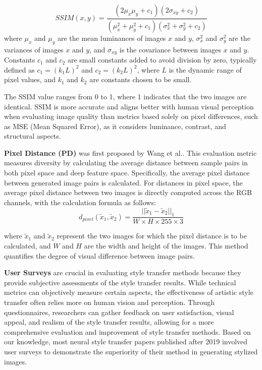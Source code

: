\documentclass[preprint,12pt]{elsarticle}
\begin{document}
\begin{equation}
    SSIM(x, y) = \frac{(2\mu_x\mu_y + c_1)(2\sigma_{xy} + c_2)}{(\mu_x^2 + \mu_y^2 + c_1)(\sigma_x^2 + \sigma_y^2 + c_2)}
\end{equation}
where $\mu_x$ and $\mu_y$ are the mean luminances of images $x$ and $y$, $\sigma_x^2$ and $\sigma_y^2$ are the variances of images $x$ and $y$, and $\sigma_{xy}$ is the covariance between images $x$ and $y$. Constants $c_1$ and $c_2$ are small constants added to avoid division by zero, typically defined as $c_1=(k_1 L)^2$ and $c_2=(k_2 L)^2$, where $L$ is the dynamic range of pixel values, and $k_1$ and $k_2$ are constants chosen to be small.

The SSIM value ranges from 0 to 1, where 1 indicates that the two images are identical. SSIM is more accurate and aligns better with human visual perception when evaluating image quality than metrics based solely on pixel differences, such as MSE (Mean Squared Error), as it considers luminance, contrast, and structural aspects.

\textbf{Pixel Distance (PD)} was first proposed by Wang et al.\citep{76wang2020diversified}. This evaluation metric measures diversity by calculating the average distance between sample pairs in both pixel space and deep feature space. Specifically, the average pixel distance between generated image pairs is calculated. For distances in pixel space, the average pixel distance between two images is directly computed across the RGB channels, with the calculation formula as follows:
\begin{equation}
    d_{pixel}(\tilde{x}_1, \tilde{x}_2) = \frac{||\tilde{x}_1 - \tilde{x}_2||_1}{W \times H \times 255 \times 3}
\end{equation}

where $\tilde{x}_1$ and $\tilde{x}_2$ represent the two images for which the pixel distance is to be calculated, and $W$ and $H$ are the width and height of the images. This method quantifies the degree of visual difference between image pairs.

\textbf{User Surveys} are crucial in evaluating style transfer methods because they provide subjective assessments of the style transfer results. While technical metrics can objectively measure certain aspects, the effectiveness of artistic style transfer often relies more on human vision and perception. Through questionnaires, researchers can gather feedback on user satisfaction, visual appeal, and realism of the style transfer results, allowing for a more comprehensive evaluation and improvement of style transfer methods. Based on our knowledge, most neural style transfer papers published after 2019 involved user surveys to demonstrate the superiority of their method in generating stylized images.
\end{document}
